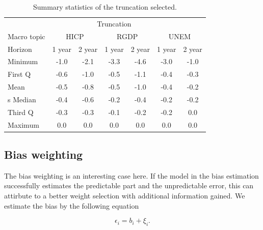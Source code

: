 \documentclass[]{article}
\begin{document}
\begin{table}[!h]
\centering
\caption{Summary statistics of the truncation selected.}
\label{tab: truncation summary statistics}
\begin{tabular}{lcccccc}%
\hline
&\multicolumn{5}{c}{Truncation}\\
\cmidrule{2-7}
Macro topic & \multicolumn{2}{c}{HICP} & \multicolumn{2}{c}{RGDP} & \multicolumn{2}{c}{UNEM} \\
\cmidrule{2-3} \cmidrule{4-5}\cmidrule{6-7}
Horizon     & 1 year & 2 year & 1 year & 2 year & 1 year & 2 year \\ 
\cmidrule{2-2} \cmidrule{3-3} \cmidrule{4-4} \cmidrule{5-5} \cmidrule{6-6} \cmidrule{7-7}
Minimum     & -1.0        & -2.1        & -3.3        & -4.6        & -3.0        & -1.0        \\
First Q     & -0.6        & -1.0        & -0.5        & -1.1        & -0.4        & -0.3        \\
Mean        & -0.5        & -0.8        & -0.5        & -1.0        & -0.4        & -0.2        \\s
Median      & -0.4        & -0.6        & -0.2        & -0.4        & -0.2        & -0.2        \\
Third Q     & -0.3        & -0.3        & -0.1        & -0.2        & -0.2        & 0.0         \\
Maximum     & 0.0         & 0.0         & 0.0         & 0.0         & 0.0         & 0.0         \\ 
\hline
\end{tabular}
\end{table}

\subsection{Bias weighting}\label{bias-weighting}

The bias weighting is an interesting case here. If the model in the bias
estimation successfully estimates the predictable part and the
unpredictable error, this can attirbute to a better weight selection
with additional information gained. We estimate the bias by the
following equation

\begin{equation}
\epsilon_i = b_i + \xi_i.
\end{equation}
\end{document}
